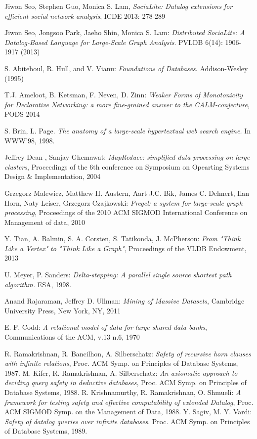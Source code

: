\documentclass{pracamgr}
\theoremstyle{plain}
\theoremstyle{definition}
\theoremstyle{remark}
\begin{document}
\begin{thebibliography}{99}


 Jiwon Seo, Stephen Guo, Monica S. Lam, \textit{SociaLite: Datalog extensions for efficient social network analysis}, ICDE 2013: 278-289

 Jiwon Seo, Jongsoo Park, Jaeho Shin, Monica S. Lam: \textit{Distributed SociaLite: A Datalog-Based Language for Large-Scale Graph Analysis}. PVLDB 6(14): 1906-1917 (2013)

 S. Abiteboul, R. Hull, and V. Vianu: \textit{Foundations of Databases}. Addison-Wesley (1995)

 T.J. Ameloot, B. Ketsman, F. Neven, D. Zinn: \textit{Weaker Forms of Monotonicity for Declarative Networking: a more fine-grained answer to the CALM-conjecture}, PODS 2014

 S. Brin, L. Page. \textit{The anatomy of a large-scale hypertextual web search engine.} In WWW’98, 1998.

 Jeffrey Dean , Sanjay Ghemawat: \textit{MapReduce: simplified data processing on large clusters}, Proceedings of the 6th conference on Symposium on Opearting Systems Design \& Implementation, 2004

 Grzegorz Malewicz, Matthew H. Austern, Aart J.C. Bik, James C. Dehnert, Ilan Horn, Naty Leiser, Grzegorz Czajkowski: \textit{Pregel: a system for large-scale graph processing}, Proceedings of the 2010 ACM SIGMOD International Conference on Management of data, 2010

 Y. Tian, A. Balmin, S. A. Corsten, S. Tatikonda, J. McPherson: \textit{From "Think Like a Vertex" to "Think Like a Graph"}, Proceedings of the VLDB Endowment, 2013

 U. Meyer, P. Sanders: \textit{Delta-stepping: A parallel
single source shortest path algorithm.} ESA, 1998.

 Anand Rajaraman, Jeffrey D. Ullman: \textit{Mining of Massive Datasets}, Cambridge University Press, New York, NY, 2011

 E. F. Codd: \textit{A relational model of data for large shared data banks}, Communications of the ACM, v.13 n.6, 1970

 R. Ramakrishnan, R. Bancilhon, A. Silberschatz:  \textit{Safety of recursive horn clauses with infinite relations}, Proc. ACM Symp. on Principles of Database Systems, 1987.
 M. Kifer, R. Ramakrishnan, A. Silberschatz:  \textit{An axiomatic approach to deciding query safety in deductive databases}, Proc. ACM Symp. on Principles of Database Systems, 1988.
 R. Krishnamurthy, R. Ramakrishnan, O. Shmueli:  \textit{A framework for testing safety and effective computability of extended Datalog}, Proc. ACM SIGMOD Symp. on the Management of Data, 1988.
 Y. Sagiv, M. Y. Vardi:  \textit{Safety of datalog queries over infinite databases}.  Proc. ACM Symp. on Principles of Database Systems, 1989.


\end{thebibliography}
\end{document}
